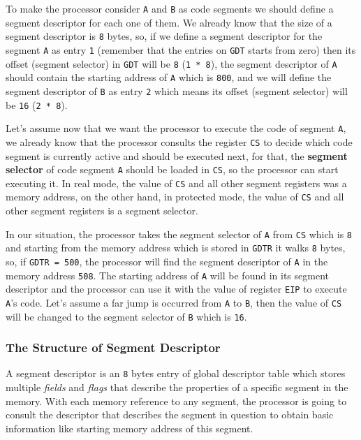 To make the processor consider \lstinline!A! and \lstinline!B! as code
segments we should define a segment descriptor for each one of them. We
already know that the size of a segment descriptor is \lstinline!8!
bytes, so, if we define a segment descriptor for the segment
\lstinline!A! as entry \lstinline!1! (remember that the entries on
\lstinline!GDT! starts from zero) then its offset (segment selector) in
\lstinline!GDT! will be \lstinline!8! (\lstinline!1 * 8!), the segment
descriptor of \lstinline!A! should contain the starting address of
\lstinline!A! which is \lstinline!800!, and we will define the segment
descriptor of \lstinline!B! as entry \lstinline!2! which means its
offset (segment selector) will be \lstinline!16! (\lstinline!2 * 8!).

Let's assume now that we want the processor to execute the code of
segment \lstinline!A!, we already know that the processor consults the
register \lstinline!CS! to decide which code segment is currently active
and should be executed next, for that, the \textbf{segment selector} of
code segment \lstinline!A! should be loaded in \lstinline!CS!, so the
processor can start executing it. In real mode, the value of
\lstinline!CS! and all other segment registers was a memory address, on
the other hand, in protected mode, the value of \lstinline!CS! and all
other segment registers is a segment selector.

In our situation, the processor takes the segment selector of
\lstinline!A! from \lstinline!CS! which is \lstinline!8! and starting
from the memory address which is stored in \lstinline!GDTR! it walks
\lstinline!8! bytes, so, if \lstinline!GDTR = 500!, the processor will
find the segment descriptor of \lstinline!A! in the memory address
\lstinline!508!. The starting address of \lstinline!A! will be found in
its segment descriptor and the processor can use it with the value of
register \lstinline!EIP! to execute \lstinline!A!'s code. Let's assume a
far jump is occurred from \lstinline!A! to \lstinline!B!, then the value
of \lstinline!CS! will be changed to the segment selector of
\lstinline!B! which is \lstinline!16!.

\subsubsection{The Structure of Segment
Descriptor}\label{the-structure-of-segment-descriptor}

A segment descriptor is an \lstinline!8! bytes entry of global
descriptor table which stores multiple \emph{fields} and \emph{flags}
that describe the properties of a specific segment in the memory. With
each memory reference to any segment, the processor is going to consult
the descriptor that describes the segment in question to obtain basic
information like starting memory address of this segment.

